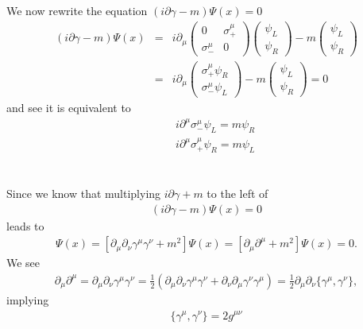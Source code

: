 \documentclass[11pt]{article}
\def\del{{\partial}}
\begin{document}
\section{ }
We now rewrite the equation $( i\del \gamma - m ) \Psi(x) = 0 $
\begin{eqnarray}
    ( i\del \gamma - m ) \Psi(x) &=& 
    i\del_\mu 
    \begin{pmatrix}
        0 & \sigma_+^\mu \\
        \sigma_-^\mu &0
    \end{pmatrix}
    \begin{pmatrix}
        \psi_L \\ \psi_R
    \end{pmatrix}
    -m
    \begin{pmatrix}
        \psi_L \\ \psi_R
    \end{pmatrix} \\
    &=&i\del_\mu
    \begin{pmatrix}
        \sigma_+^\mu \psi_R \\
        \sigma_-^\mu \psi_L
    \end{pmatrix}
    -m
    \begin{pmatrix}
        \psi_L \\ \psi_R
    \end{pmatrix}
    =0
\end{eqnarray}
and see it is equivalent to
\begin{eqnarray}
    &&i\del^\mu \sigma_-^\mu \psi_L = m \psi_R  \\
    && i\del^\mu \sigma_+^\mu \psi_R = m \psi_L
\end{eqnarray}

\section{ }
Since we know that multiplying $i\del \gamma + m $ to the left of
\begin{eqnarray}
    ( i\del \gamma - m ) \Psi(x) = 0 
\end{eqnarray}
leads to
\begin{eqnarray}
    [ i\del \gamma + m ] [ i\del \gamma - m ] \Psi(x)
    = [ \del_\mu \del_\nu \gamma^\mu \gamma^\nu + m^2 ] \Psi(x) = [ \del_\mu \del^\mu + m^2 ] \Psi(x) = 0. 
\end{eqnarray}
We see
\begin{eqnarray}
    \del_\mu \del^\mu=\del_\mu \del_\nu \gamma^\mu \gamma^\nu = \frac{1}{2}(\del_\mu \del_\nu \gamma^\mu \gamma^\nu+\del_\nu \del_\mu \gamma^\nu \gamma^\mu)=\frac{1}{2} \del_\mu \del_\nu \{\gamma^\mu,\gamma^\nu\},
\end{eqnarray}
implying
\begin{eqnarray}
    \{\gamma^\mu,\gamma^\nu\}=2g^{\mu\nu}
\end{eqnarray}
\end{document}
